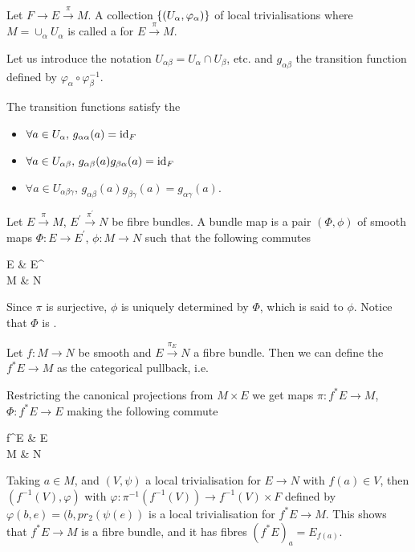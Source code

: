 \documentclass{article}
\begin{document}
\begin{definition}
	Let $F \to E \overset{\pi}{\to} M$. A collection $\left\{ (U_\alpha,\varphi_\alpha) \right\}$ of local trivialisations where $M = \cup_{\alpha} U_\alpha$ is called a  for $E \overset{\pi}{\to} M$. 
\end{definition}

Let us introduce the notation $U_{\alpha\beta} = U_\alpha \cap U_\beta$, etc. and $g_{\alpha\beta}$ the transition function defined by $\varphi_\alpha \circ \varphi_\beta^{-1}$. 

\begin{fact}
	The transition functions satisfy the 
	\begin{itemize}
		\item $\forall a \in U_\alpha, \, g_{\alpha\alpha}(a) = \operatorname{id}_F$
		\item $\forall a \in U_{\alpha\beta}, \, g_{\alpha\beta}(a)g_{\beta\alpha}(a) = \operatorname{id}_F$
		\item $\forall a \in U_{\alpha\beta\gamma}, \, g_{\alpha\beta}(a)g_{\beta\gamma}(a)=g_{\alpha\gamma}(a)$.
	\end{itemize}
\end{fact}

\begin{definition}
	Let $E \overset{\pi}{\to} M$, $E^\prime \overset{\pi^\prime}{\to} N$ be fibre bundles. A bundle map is a pair $(\Phi,\phi)$ of smooth maps $\Phi:E \to E^\prime$, $\phi:M \to N$ such that the following commutes
	\begin{tkz}
		E \arrow[r,"\Phi"] \arrow[d,"\pi"'] & E^\prime \arrow[d,"\pi^\prime"] \\ M \arrow[r,"\phi"] & N
	\end{tkz}
	Since $\pi$ is surjective, $\phi$ is uniquely determined by $\Phi$, which is said to  $\phi$. Notice that $\Phi$ is . 
\end{definition}

\begin{definition}
	Let $f:M \to  N$ be smooth and $E \overset{\pi_E}{\to} N$ a fibre bundle. Then we can define the  $f^\ast E \to M$ as the categorical pullback, i.e. 
	\eq{
		f^\ast E \equiv \pbrace{(a,e) \in M \times E \, | \, \pi_E(e) = f(a)}
	}
\end{definition}
Restricting the canonical projections from $M \times E$ we get maps $\pi : f^\ast E \to M$, $\Phi:f^\ast E \to E$ making the following commute 
\begin{tkz}
	f^\ast E \arrow[r,"\Phi"] \arrow[d,"\pi"'] & E \arrow[d,"\pi_E"] \\ M \arrow[r,"f"] & N
\end{tkz}
Taking $ a \in M$, and $(V, \psi)$ a local trivialisation for $E \to N$ with $f(a) \in V$, then $(f^{-1}(V),\varphi)$ with $\varphi: \pi^{-1}(f^{-1}(V)) \to f^{-1}(V) \times F$ defined by $\varphi(b,e) = (b,pr_2(\psi(e))$ is a local trivialisation for $f^\ast E \to M$. This shows that $f^\ast E \to M$ is a fibre bundle, and it has fibres $(f^\ast E)_a = E_{f(a)}$. 
\end{document}
